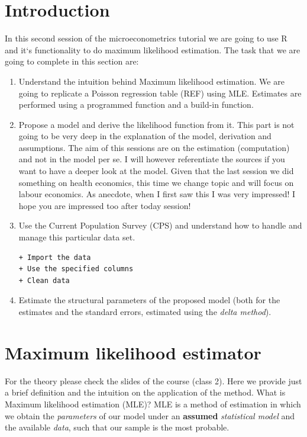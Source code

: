\documentclass[]{book}
\begin{document}
\section{Introduction}\label{introduction-1}

In this second session of the microeconometrics tutorial we are going to
use R and it`s functionality to do maximum likelihood estimation. The
task that we are going to complete in this section are:

\begin{enumerate}
\def\labelenumi{\arabic{enumi}.}
\item
  Understand the intuition behind Maximum likelihood estimation. We are
  going to replicate a Poisson regression table (REF) using MLE.
  Estimates are performed using a programmed function and a build-in
  function.
\item
  Propose a model and derive the likelihood function from it. This part
  is not going to be very deep in the explanation of the model,
  derivation and assumptions. The aim of this sessions are on the
  estimation (computation) and not in the model per se. I will however
  referentiate the sources if you want to have a deeper look at the
  model. Given that the last session we did something on health
  economics, this time we change topic and will focus on labour
  economics. As anecdote, when I first saw this I was very impressed! I
  hope you are impressed too after today session!
\item
  Use the Current Population Survey (CPS) and understand how to handle
  and manage this particular data set.

\begin{verbatim}
+ Import the data
+ Use the specified columns
+ Clean data
\end{verbatim}
\item
  Estimate the structural parameters of the proposed model (both for the
  estimates and the standard errors, estimated using the \emph{delta
  method}).
\end{enumerate}

\section{Maximum likelihood
estimator}\label{maximum-likelihood-estimator}

For the theory please check the slides of the course (class 2). Here we
provide just a brief definition and the intuition on the application of
the method. What is Maximum likelihood estimation (MLE)? MLE is a method
of estimation in which we obtain the \emph{parameters} of our model
under an \textbf{assumed} \emph{statistical model} and the available
\emph{data}, such that our sample is the most probable.
\end{document}
